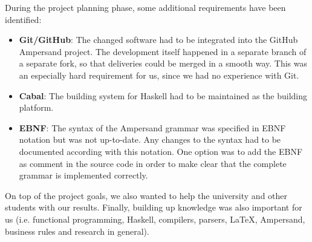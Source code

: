 During the project planning phase, some additional requirements have been identified:
\begin{itemize}
  \item \textbf{Git/GitHub}: The changed software had to be integrated into the GitHub Ampersand project.
    The development itself happened in a separate branch of a separate fork, so that deliveries could be merged in a smooth way.
    This was an especially hard requirement for us, since we had no experience with Git.
  \item \textbf{Cabal}: The building system for Haskell had to be maintained as the building platform.
  \item \textbf{EBNF}: The syntax of the Ampersand grammar was specified in EBNF notation but was not up-to-date.
    Any changes to the syntax had to be documented according with this notation.
    One option was to add the EBNF as comment in the source code in order to make clear that the complete grammar is implemented correctly.
\end{itemize}

On top of the project goals, we also wanted to help the university and other students with our results.
Finally, building up knowledge was also important for us (i.e. functional programming, Haskell, compilers, parsers, LaTeX, Ampersand, business rules and research in general).
